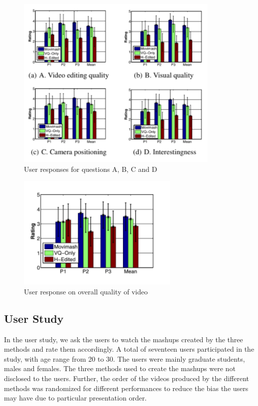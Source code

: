 \documentclass{sig-alternate}
\begin{document}
\begin{figure}
    \centering
    \includegraphics{img7.png}
    \caption{User responses for questions A, B, C and D}
    \label{fig:fig7}
\end{figure}

\begin{figure}
    \centering
    \includegraphics{img8.png}
    \caption{User response on overall quality of video}
    \label{fig:fig8}
\end{figure}

\subsection{User Study}
In the user study, we ask the users to watch the mashups created
by the three methods and rate them accordingly. A total of seventeen users participated in the study, with age range from 20 to 30. The users were mainly graduate students, males and females. The three methods used to create the mashups were not disclosed to the users. Further, the order of the videos produced by the different methods was randomized for different performances to reduce the bias the users may have due to particular presentation order.
\end{document}
